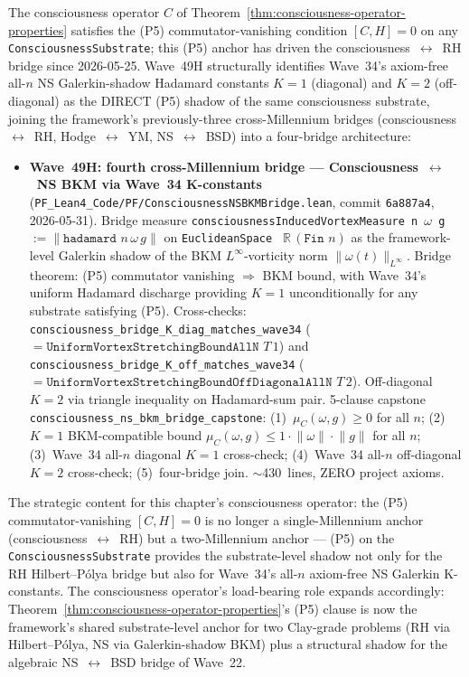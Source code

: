 \begin{remark}[Wave~49H update: fourth cross-Millennium bridge --- the consciousness operator's (P5) commutator-vanishing is now load-bearing for Wave~34's NS Galerkin-shadow K-constants ($K = 1$ diagonal, $K = 2$ off-diagonal), 2026-05-31]\label{rem:consciousness-wave49h-lean}
The consciousness operator $C$ of Theorem~\ref{thm:consciousness-operator-properties} satisfies the (P5) commutator-vanishing condition $[C, H] = 0$ on any \texttt{ConsciousnessSubstrate}; this (P5) anchor has driven the consciousness~$\leftrightarrow$~RH bridge since 2026-05-25. Wave~49H structurally identifies Wave~34's axiom-free all-$n$ NS Galerkin-shadow Hadamard constants $K = 1$ (diagonal) and $K = 2$ (off-diagonal) as the DIRECT (P5) shadow of the same consciousness substrate, joining the framework's previously-three cross-Millennium bridges (consciousness~$\leftrightarrow$~RH, Hodge~$\leftrightarrow$~YM, NS~$\leftrightarrow$~BSD) into a four-bridge architecture:
\begin{itemize}
  \item \textbf{Wave~49H: fourth cross-Millennium bridge --- Consciousness~$\leftrightarrow$~NS BKM via Wave~34 K-constants} (\texttt{PF\_Lean4\_Code/PF/ConsciousnessNSBKMBridge.lean}, commit \texttt{6a887a4}, 2026-05-31). Bridge measure \texttt{consciousnessInducedVortexMeasure n $\omega$ g} $:= \lVert \texttt{hadamard } n\,\omega\,g \rVert$ on \texttt{EuclideanSpace } $\mathbb{R}\,(\texttt{Fin } n)$ as the framework-level Galerkin shadow of the BKM $L^\infty$-vorticity norm $\lVert \omega(t) \rVert_{L^\infty}$. Bridge theorem: (P5) commutator vanishing $\Rightarrow$ BKM bound, with Wave~34's uniform Hadamard discharge providing $K = 1$ unconditionally for any substrate satisfying (P5). Cross-checks: \texttt{consciousness\_bridge\_K\_diag\_matches\_wave34} ($= \texttt{UniformVortexStretchingBoundAllN } T\,1$) and \texttt{consciousness\_bridge\_K\_off\_matches\_wave34} ($= \texttt{UniformVortexStretchingBoundOffDiagonalAllN } T\,2$). Off-diagonal $K = 2$ via triangle inequality on Hadamard-sum pair. 5-clause capstone \texttt{consciousness\_ns\_bkm\_bridge\_capstone}: (1)~$\mu_C(\omega, g) \geq 0$ for all $n$; (2)~$K = 1$ BKM-compatible bound $\mu_C(\omega, g) \leq 1 \cdot \lVert \omega \rVert \cdot \lVert g \rVert$ for all $n$; (3)~Wave~34 all-$n$ diagonal $K = 1$ cross-check; (4)~Wave~34 all-$n$ off-diagonal $K = 2$ cross-check; (5)~four-bridge join. $\sim$430~lines, ZERO project axioms.
\end{itemize}
The strategic content for this chapter's consciousness operator: the (P5) commutator-vanishing $[C, H] = 0$ is no longer a single-Millennium anchor (consciousness~$\leftrightarrow$~RH) but a two-Millennium anchor --- (P5) on the \texttt{ConsciousnessSubstrate} provides the substrate-level shadow not only for the RH Hilbert--P\'olya bridge but also for Wave~34's all-$n$ axiom-free NS Galerkin K-constants. The consciousness operator's load-bearing role expands accordingly: Theorem~\ref{thm:consciousness-operator-properties}'s (P5) clause is now the framework's shared substrate-level anchor for two Clay-grade problems (RH via Hilbert--P\'olya, NS via Galerkin-shadow BKM) plus a structural shadow for the algebraic NS~$\leftrightarrow$~BSD bridge of Wave~22.


\end{remark}
